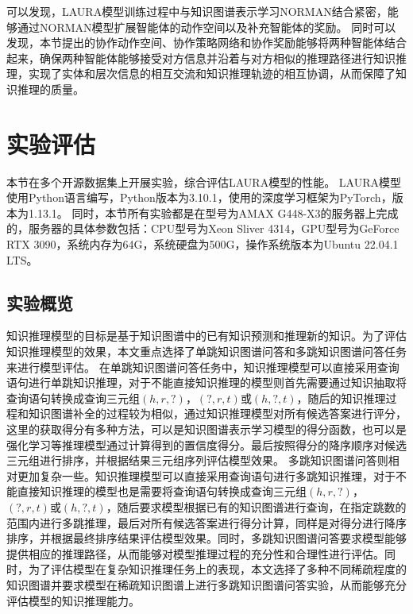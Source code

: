 \documentclass[algorithmlist, AutoFakeBold, AutoFakeSlant, figurelist, tablelist, nomlist, engineering, openany]{seuthesix} %
\begin{document}
可以发现，LAURA模型训练过程中与知识图谱表示学习NORMAN结合紧密，能够通过NORMAN模型扩展智能体的动作空间以及补充智能体的奖励。
同时可以发现，本节提出的协作动作空间、协作策略网络和协作奖励能够将两种智能体结合起来，确保两种智能体能够接受对方信息并沿着与对方相似的推理路径进行知识推理，实现了实体和层次信息的相互交流和知识推理轨迹的相互协调，从而保障了知识推理的质量。

\section{实验评估}
本节在多个开源数据集上开展实验，综合评估LAURA模型的性能。
LAURA模型使用Python语言编写，Python版本为3.10.1，使用的深度学习框架为PyTorch，版本为1.13.1。
同时，本节所有实验都是在型号为AMAX G448-X3的服务器上完成的，服务器的具体参数包括：CPU型号为Xeon Sliver 4314，GPU型号为GeForce RTX 3090，系统内存为64G，系统硬盘为500G，操作系统版本为Ubuntu 22.04.1 LTS。

\subsection{实验概览}
知识推理模型的目标是基于知识图谱中的已有知识预测和推理新的知识。为了评估知识推理模型的效果，本文重点选择了单跳知识图谱问答和多跳知识图谱问答任务来进行模型评估。
在单跳知识图谱问答任务中，知识推理模型可以直接采用查询语句进行单跳知识推理，对于不能直接知识推理的模型则首先需要通过知识抽取将查询语句转换成查询三元组$(h, r, ?)$，$(?, r, t)$或$(h, ?, t)$，随后的知识推理过程和知识图谱补全的过程较为相似，通过知识推理模型对所有候选答案进行评分，这里的获取得分有多种方法，可以是知识图谱表示学习模型的得分函数，也可以是强化学习等推理模型通过计算得到的置信度得分。最后按照得分的降序顺序对候选三元组进行排序，并根据结果三元组序列评估模型效果。
多跳知识图谱问答则相对更加复杂一些。知识推理模型可以直接采用查询语句进行多跳知识推理，对于不能直接知识推理的模型也是需要将查询语句转换成查询三元组$(h, r, ?)$，$(?, r, t)$或$(h, ?, t)$，随后要求模型根据已有的知识图谱进行查询，在指定跳数的范围内进行多跳推理，最后对所有候选答案进行得分计算，同样是对得分进行降序排序，并根据最终排序结果评估模型效果。同时，多跳知识图谱问答要求模型能够提供相应的推理路径，从而能够对模型推理过程的充分性和合理性进行评估。同时，为了评估模型在复杂知识推理任务上的表现，本文选择了多种不同稀疏程度的知识图谱并要求模型在稀疏知识图谱上进行多跳知识图谱问答实验，从而能够充分评估模型的知识推理能力。
\end{document}

